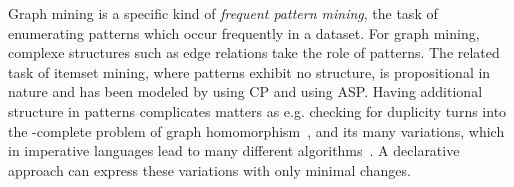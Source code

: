 

Graph mining is a specific kind of \emph{frequent pattern mining}, the task of enumerating patterns which occur frequently in a dataset.
For graph mining, complexe structures such as edge relations take the role of patterns. The related task of itemset mining, where patterns exhibit no structure, is propositional in nature and has been modeled by \citet{tias_original} using CP and \citet{asp_itemset} using ASP.
Having additional structure in patterns complicates matters as e.g. checking for duplicity turns into the  \NP-complete problem of graph homomorphism~\citep{Lev73}, and its many variations, which in imperative languages lead to many different algorithms~\citep{gspan,theta_subsumption}.
A declarative approach can express these variations with only minimal changes.

